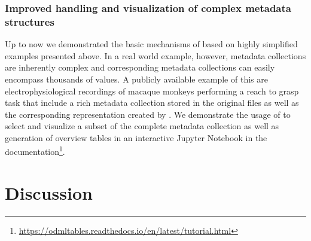 


\subsubsection*{Improved handling and visualization of complex metadata structures}
Up to now we demonstrated the basic mechanisms of  based on highly simplified examples presented above. In a real world example, however, metadata collections are inherently complex and corresponding metadata collections can easily encompass thousands of values. A publicly available example of this are electrophysiological recordings of macaque monkeys performing a reach to grasp task that include a rich metadata collection stored in the original  files as well as the corresponding  representation created by  \citep{Brochier_2018}. We demonstrate the usage of  to select and visualize a subset of the complete metadata collection as well as generation of overview tables in an interactive Jupyter Notebook in the  documentation\footnote{\url{https://odmltables.readthedocs.io/en/latest/tutorial.html}}.

\section{Discussion}
\label{sec:Discussion}

